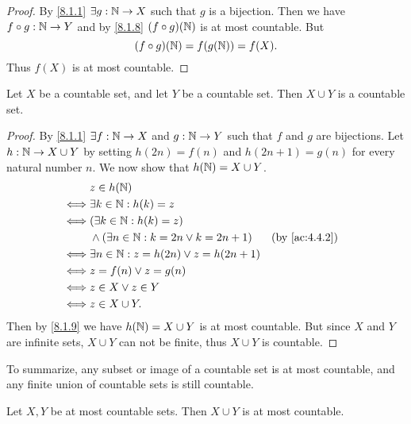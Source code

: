 \begin{proof}
  By \cref{8.1.1} \(\exists g : \mathbb{N} \to X\) such that \(g\) is a bijection.
  Then we have \(f \circ g : \mathbb{N} \to Y\) and by \cref{8.1.8} \((f \circ g)(\mathbb{N})\) is at most countable.
  But
  \[
    (f \circ g)(\mathbb{N}) = f(g(\mathbb{N})) = f(X).
  \]
  Thus \(f(X)\) is at most countable.
\end{proof}

\begin{prop}\label{8.1.10}
  Let \(X\) be a countable set, and let \(Y\) be a countable set.
  Then \(X \cup Y\) is a countable set.
\end{prop}

\begin{proof}
  By \cref{8.1.1} \(\exists f : \mathbb{N} \to X\) and \(g : \mathbb{N} \to Y\) such that \(f\) and \(g\) are bijections.
  Let \(h : \mathbb{N} \to X \cup Y\) by setting \(h(2n) = f(n)\) and \(h(2n + 1) = g(n)\) for every natural number \(n\).
  We now show that \(h(\mathbb{N}) = X \cup Y\).
  \begin{align*}
         & z \in h(\N)                                                          \\
    \iff & \exists k \in \N : h(k) = z                                          \\
    \iff & (\exists k \in \N : h(k) = z)                                        \\
         & \land (\exists n \in \N : k = 2n \lor k = 2n + 1) &  & \by{ac:4.4.2} \\
    \iff & \exists n \in \N : z = h(2n) \lor z = h(2n + 1)                      \\
    \iff & z = f(n) \lor z = g(n)                                               \\
    \iff & z \in X \lor z \in Y                                                 \\
    \iff & z \in X \cup Y.
  \end{align*}
  Then by \cref{8.1.9} we have \(h(\mathbb{N}) = X \cup Y\) is at most countable.
  But since \(X\) and \(Y\) are infinite sets, \(X \cup Y\) can not be finite, thus \(X \cup Y\) is countable.
\end{proof}

\begin{note}
  To summarize, any subset or image of a countable set is at most countable, and any finite union of countable sets is still countable.
\end{note}

\begin{ac}\label{ac:8.1.1}
  Let \(X, Y\) be at most countable sets.
  Then \(X \cup Y\) is at most countable.
\end{ac}

